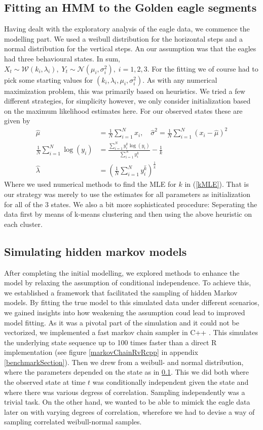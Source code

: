 \subsection{Fitting an HMM to the Golden eagle segments}\label{hmmGoldenEagle}
Having dealt with the exploratory analysis of the eagle data, we commence the modelling part. We used a weibull distribution for the horizontal steps and a normal distribution for the vertical steps. An our assumption was that the eagles had three behavioural states. In sum, $X_t \sim \mathcal{W}(k_i, \lambda_i), \; Y_t \sim \mathcal{N}(\mu_i, \sigma_i^2), \; i = 1,2,3$. For the fitting we of course  had to pick some starting values for $(k_i, \lambda_i, \mu_i, \sigma_i^2)$. As with any numerical maximization problem, this was primarily based on heuristics. We tried a few different strategies, for simplicity however, we only consider initialization based on the maximum likelihood estimates here. For our observed states these are given by\cite{Cohen1965}
\begin{align}
    \hat{\mu} &= \frac{1}{N}\sum_{i = 1}^N x_i, \quad \hat{\sigma}^2 = \frac{1}{N}\sum_{i = 1}^N \left(x_i-\hat{\mu}\right)^2\\
    \frac{1}{N}\sum_{i = 1}^N \log(y_i)&= \frac{\sum_{i = 1}^N y_i^k\log(y_i)}{\sum_{i = 1}^N y_i^k} - \frac{1}{k} \label{kMLE} \\  \hat{\lambda} &= \left(\frac{1}{N} \sum_{i = 1}^N y_i^{\hat{k}}\right)^{\frac{1}{\hat{k}}}
\end{align}
Where we used numerical methods to find the MLE for $k$ in (\ref{kMLE}). That is our strategy was merely to use the estimates for all parameters as initialization for all of the $3$ states. We also a bit more sophisticated procedure: Seperating the data first by means of k-means clustering \cite{RLang} and then using the above heuristic on each cluster.
\subsection{Simulating hidden markov models}\label{simHMM}
After completing the initial modelling, we explored methods to enhance the model by relaxing the assumption of conditional independence. To achieve this, we established a framework that facilitated the sampling of hidden Markov models. By fitting the true model to this simulated data under different scenarios, we gained insights into how weakening the assumption coud lead to improved model fitting. As it was a pivotal part of the simulation and it could not be vectorized, we implemented a fast markov chain sampler in C++ \cite{Rcpp}. This simulates the underlying state sequence up to 100 times faster than a direct R implementation (see figure \ref{markovChainRvRcpp} in appendix \ref{benchmarkSection}). Then we drew from a weibull- and normal distribution, where the parameters depended on the state as in \ref{hmmGoldenEagle}. This we did both where the observed state at time $t$ was conditionally independent given the state and where there was various degress of correlation. Sampling independently was a trivial task. On the other hand, we wanted to be able to mimick the eagle data later on with varying degrees of correlation, wherefore we had to devise a way of sampling correlated weibull-normal samples. 
